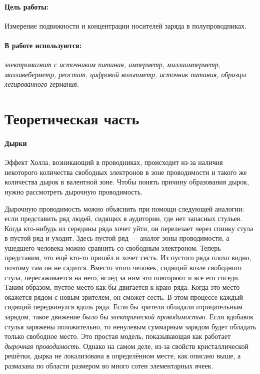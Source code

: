 \documentclass{physlab}
\begin{document}
	

\paragraph{Цель работы:} Измерение подвижности и концентрации носителей заряда в полупроводниках.

\paragraph{В работе используются:} \textit{электромагнит с источником питания, амперметр, миллиамперметр, милливеберметр, реостат, цифровой вольтметр, источник питания, образцы легированного германия.}


\section{Теоретическая часть}

\paragraph{Дырки}

Эффект Холла, возникающий в проводниках, происходит из-за наличия некоторого количества свободных электронов в зоне проводимости и такого же количества дырок в валентной зоне. Чтобы понять причину образования дырок, нужно рассмотреть дырочную проводимость.


Дырочную проводимость можно объяснить при помощи следующей аналогии: если представить ряд людей, сидящих в аудитории, где нет запасных стульев. Когда кто-нибудь из середины ряда хочет уйти, он      перелезает через спинку стула в пустой ряд и уходит. Здесь пустой ряд — аналог зоны проводимости, а ушедшего человека можно сравнить со свободным электроном.
Теперь представим, что ещё кто-то пришёл и хочет сесть. Из пустого ряда плохо видно, поэтому там он не садится. Вместо этого человек, сидящий возле свободного стула, пересаживается на него, вслед за ним это повторяют и все его соседи. Таким образом, пустое место как бы двигается к краю ряда. Когда это место окажется рядом с новым зрителем, он сможет сесть.
В этом процессе каждый сидящий передвинулся вдоль ряда. Если бы зрители обладали отрицательным зарядом, такое движение было бы  \textit{электрической проводимостью}. Если вдобавок стулья заряжены положительно, то ненулевым суммарным зарядом будет обладать только свободное место. Это простая модель, показывающая как работает \textit{дырочная проводимость}. Однако на самом деле, из-за свойств кристаллической решётки, дырка не локализована в определённом месте, как описано выше, а размазана по области размером во много сотен элементарных ячеек.\\[-10mm]
\end{document}
